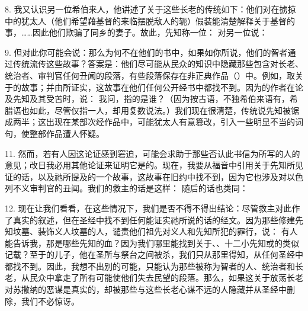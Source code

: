 8. 我又认识另一位希伯来人，他讲述了关于这些长老的传统如下：他们对在掳掠中的犹太人（他们希望藉基督的来临摆脱敌人的轭）假装能清楚解释关于基督的事，……因此他们欺骗了同乡的妻子。故此，先知称一位： 对另一位说：\par

9. 但对此你可能会说：那么为何不在他们的书中，如果如你所说，他们的智者通过传统流传这些故事？答案是：他们尽可能从民众的知识中隐藏那些包含对长老、统治者、审判官任何丑闻的段落，有些段落保存在非正典作品（）中。例如，取关于的故事；并由所证实，这故事在他们任何公开经书中都找不到。因为的作者在论及先知及其受苦时，说： 我问，指的是谁？（因为按古语，不独希伯来语有，希腊语也如此，尽管仅指一人，却用复数说法。）我们现在很清楚，传统说先知被锯成两半；这出现在某部次经作品中，可能犹太人有意篡改，引入一些明显不当的词句，使整部作品遭人怀疑。\par

11. 然而，若有人因这论证感到窘迫，可能会求助于那些否认此书信为所写的人的意见；改日我必用其他论证来证明它是的。现在，我要从福音中引用关于先知所见证的话，以及祂所提及的一个故事，这故事在旧约中找不到，因为它也涉及对以色列不义审判官的丑闻。我们的救主的话是这样： 随后的话也类同：\par

12. 现在让我们看看，在这些情况下，我们是否不得不得出结论：尽管救主对此作了真实的叙述，但在圣经中找不到任何能证实祂所说的话的经文。因为那些修建先知坟墓、装饰义人坟墓的人，谴责他们祖先对义人和先知所犯的罪行，说： 有人能告诉我，那是哪些先知的血？因为我们哪里能找到关于、、十二小先知或的类似记载？至于的儿子，他在圣所与祭台之间被杀，我们只从那里得知，从任何圣经中都找不到。因此，我想不出别的可能，只能认为那些被称为智者的人、统治者和长老，从民众中拿走了所有可能使他们失去民望的段落。那么，如果这关于放荡长老对苏撒纳的恶谋是真实的，却被那些与这些长老心谋不远的人隐藏并从圣经中删除，我们不必惊讶。\par

